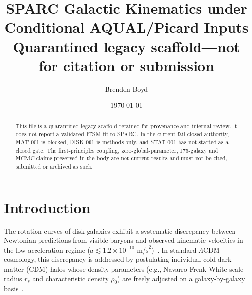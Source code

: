 \documentclass[aps,prd,twocolumn,superscriptaddress,nofootinbib,amsmath,amssymb]{revtex4-2}
\begin{document}
\title{SPARC Galactic Kinematics under Conditional AQUAL/Picard Inputs\\{\large Quarantined legacy scaffold---not for citation or submission}}

\author{Brendon Boyd}

\date{\today}

\begin{abstract}
This file is a quarantined legacy scaffold retained for provenance and internal review. It does not report a validated ITSM fit to SPARC. In the current fail-closed authority, MAT-001 is blocked, DISK-001 is methods-only, and STAT-001 has not started as a closed gate. The first-principles coupling, zero-global-parameter, 175-galaxy and MCMC claims preserved in the body are not current results and must not be cited, submitted or archived as such.
\end{abstract}

\maketitle

\begin{center}
\end{center}

\section{Introduction}
\label{sec:intro}

The rotation curves of disk galaxies exhibit a systematic discrepancy between Newtonian predictions from visible baryons and observed kinematic velocities in the low-acceleration regime ($a \lesssim 1.2 \times 10^{-10}\text{ m/s}^2$)~\cite{rubin1980,lelli_sparc_2016}. In standard $\Lambda\text{CDM}$ cosmology, this discrepancy is addressed by postulating individual cold dark matter (CDM) halos whose density parameters (e.g., Navarro-Frenk-White scale radius $r_s$ and characteristic density $\rho_0$) are freely adjusted on a galaxy-by-galaxy basis~\cite{nfw1997}.
\end{document}
